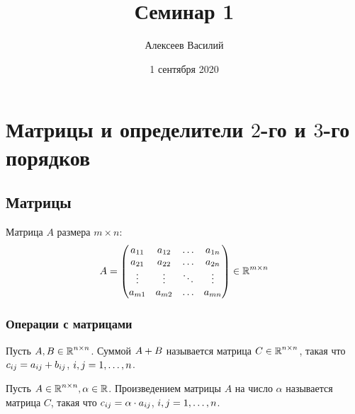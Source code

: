 \documentclass[a4paper,12pt]{article}
\author{Алексеев Василий}
\title{Семинар 1}
\date{1 сентября 2020}
\begin{document}
  \maketitle
  
  \tableofcontents

  \thispagestyle{empty}
  
  \newpage
  


  \section{Матрицы и определители $2$-го и $3$-го порядков}

  \subsection{Матрицы}

  Матрица $A$ размера $m \times n$:
  \[
    A = \begin{pmatrix}
      a_{11} & a_{12} & \ldots & a_{1n}\\
      a_{21} & a_{22} & \ldots & a_{2n}\\
      \vdots & \vdots & \ddots & \vdots\\
      a_{m1} & a_{m2} & \ldots & a_{mn}
    \end{pmatrix} \in \operatorname{\mathbb R}^{m \times n}
  \]
  
  
  \subsubsection{Операции с матрицами}
  
  \begin{definition}
    Пусть $A, B \in \operatorname{\mathbb R}^{n \times n}$.
    Суммой $A \hm+ B$ называется матрица $C \hm\in \RR^{n \times n}$, такая что
    $c_{ij} \hm= a_{ij} + b_{ij}$, $i, j \hm= 1, \ldots, n$.
  \end{definition}
  
  \begin{definition}
    Пусть $A \in \operatorname{\mathbb R}^{n \times n}, \alpha \in \operatorname{\mathbb R}$.
    Произведением матрицы $A$ на число $\alpha$ называется матрица $C$, такая что
    $c_{ij} \hm= \alpha \cdot a_{ij}$, $i, j \hm= 1, \ldots, n$.
  \end{definition}
  
\end{document}
